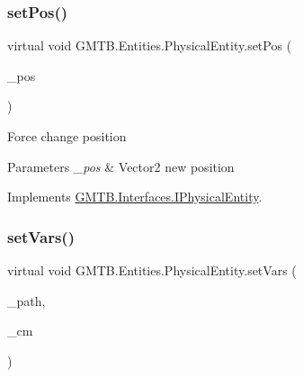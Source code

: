 \mbox{\label{class_g_m_t_b_1_1_entities_1_1_physical_entity_af0d908be428b69c35e3d8707cf25e298}} 
\subsubsection{\texorpdfstring{setPos()}{setPos()}}
{\footnotesize\ttfamily virtual void G\+M\+T\+B.\+Entities.\+Physical\+Entity.\+set\+Pos (\begin{DoxyParamCaption}\item[{Vector2}]{\+\_\+pos }\end{DoxyParamCaption})\hspace{0.3cm}{\ttfamily [virtual]}}



Force change position 


\begin{DoxyParams}{Parameters}
{\em \+\_\+pos} & Vector2 new position \\
\hline
\end{DoxyParams}


Implements \mbox{\hyperlink{interface_g_m_t_b_1_1_interfaces_1_1_i_physical_entity}{G\+M\+T\+B.\+Interfaces.\+I\+Physical\+Entity}}.

\mbox{\label{class_g_m_t_b_1_1_entities_1_1_physical_entity_add277bab26367c3364210b3577f6d7cd}} 
\subsubsection{\texorpdfstring{setVars()}{setVars()}}
{\footnotesize\ttfamily virtual void G\+M\+T\+B.\+Entities.\+Physical\+Entity.\+set\+Vars (\begin{DoxyParamCaption}\item[{string}]{\+\_\+path,  }\item[{\mbox{\hyperlink{interface_g_m_t_b_1_1_interfaces_1_1_i_content___manager}{I\+Content\+\_\+\+Manager}}}]{\+\_\+cm }\end{DoxyParamCaption})\hspace{0.3cm}{\ttfamily [virtual]}}



